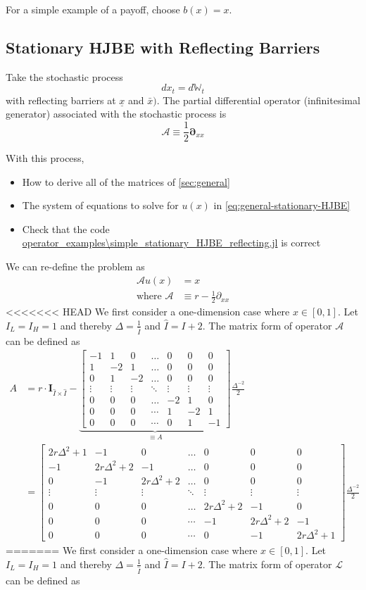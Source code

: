 \documentclass[11pt]{article}
\newcommand{\D}[1][]{\ensuremath{\boldsymbol{\partial}_{#1}}}
\newcommand{\W}{\ensuremath{\mathbb{W}}}
\newcommand{\A}{\ensuremath{\mathcal{A}}}
\begin{document}
For a simple example of a payoff, choose $b(x) = x$.

\subsection{Stationary HJBE with Reflecting Barriers}
Take the stochastic process
$$
d x_t = d \W_t
$$
with reflecting barriers at $\underline{x}$ and $\bar{x})$.  The partial differential operator (infinitesimal generator) associated with the stochastic process is
$$
	\A \equiv \frac{1}{2}\D[xx]
$$

With this process,
\begin{itemize}
	\item How to derive all of the matrices of \cref{sec:general}
	\item The system of equations to solve for $u(x)$ in \cref{eq:general-stationary-HJBE}
	\item Check that the code \url{operator_examples\simple_stationary_HJBE_reflecting.jl} is correct
\end{itemize}
We can re-define the problem as 
\begin{align}
\A u(x) &= x\label{HJBE_reflecting_barriers_PDE}\\
\text{where }\A&\equiv r - \frac{1}{2}\partial_{xx}
\end{align}
<<<<<<< HEAD
We first consider a one-dimension case where $x\in [0, 1]$. Let $I_L = I_H = 1$ and thereby $\Delta  = \frac{1}{\bar{I}}$ and $\hat{I} = I+2$. The matrix form of operator $\A$ can be defined as
\begin{align}
A &= r\cdot \mathbf{I}_{\hat{I}\times\hat{I}}-\underbrace{\begin{bmatrix}
-1&1&0&\dots&0&0&0\\
1&-2&1&\dots&0&0&0\\
0&1&-2&\dots&0&0&0\\
\vdots&\vdots&\vdots&\ddots&\vdots&\vdots&\vdots\\
0&0&0&\dots&-2&1&0\\
0&0&0&\cdots&1&-2&1\\
0&0&0&\cdots&0&1&-1
\end{bmatrix}}_{\equiv A}\frac{\Delta^{-2}}{2}\nonumber\\
&=
\begin{bmatrix}
2r\Delta^2+1&-1&0&\dots&0&0&0\\
-1&2r\Delta^2+2&-1&\dots&0&0&0\\
0&-1&2r\Delta^2+2&\dots&0&0&0\\
\vdots&\vdots&\vdots&\ddots&\vdots&\vdots&\vdots\\
0&0&0&\dots&2r\Delta^2+2&-1&0\\
0&0&0&\cdots&-1&2r\Delta^2+2&-1\\
0&0&0&\cdots&0&-1&2r\Delta^2+1
\end{bmatrix}\frac{\Delta^{-2}}{2}
\end{align}
=======
We first consider a one-dimension case where $x\in [0, 1]$. Let $I_L = I_H = 1$ and thereby $\Delta  = \frac{1}{\hat{I}}$ and $\hat{I} = I+2$. The matrix form of operator $\mathcal{L}$ can be defined as
\end{document}
